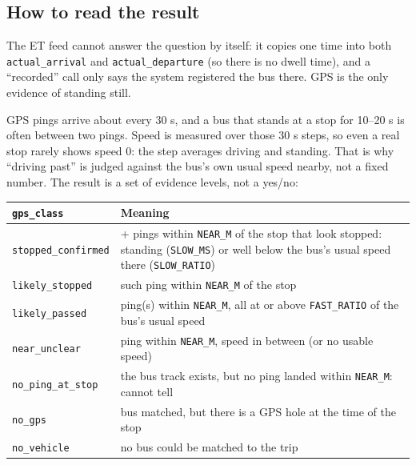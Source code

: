 \documentclass[11pt]{article}
\begin{document}
    \subsection{How to read the result}\label{how-to-read-the-result}

The ET feed cannot answer the question by itself: it copies one time
into both \texttt{actual\_arrival} and \texttt{actual\_departure} (so
there is no dwell time), and a ``recorded'' call only says the system
registered the bus there. GPS is the only evidence of standing still.

GPS pings arrive about every 30 s, and a bus that stands at a stop for
10--20 s is often between two pings. Speed is measured over those 30 s
steps, so even a real stop rarely shows speed 0: the step averages
driving and standing. That is why ``driving past'' is judged against the
bus's own usual speed nearby, not a fixed number. The result is a set of
evidence levels, not a yes/no:

\begin{longtable}[]{@{}
  >{\raggedright\arraybackslash}p{}
  >{\raggedright\arraybackslash}p{}@{}}
\toprule\noalign{}
\begin{minipage}[b]{\linewidth}\raggedright
\texttt{gps\_class}
\end{minipage} & \begin{minipage}[b]{\linewidth}\raggedright
Meaning
\end{minipage} \\
\midrule\noalign{}
\endhead
\bottomrule\noalign{}
\endlastfoot
\texttt{stopped\_confirmed} & 2+ pings within \texttt{NEAR\_M} of the
stop that look stopped: standing (\texttt{SLOW\_MS}) or well below the
bus's usual speed there (\texttt{SLOW\_RATIO}) \\
\texttt{likely\_stopped} & 1 such ping within \texttt{NEAR\_M} of the
stop \\
\texttt{likely\_passed} & ping(s) within \texttt{NEAR\_M}, all at or
above \texttt{FAST\_RATIO} of the bus's usual speed \\
\texttt{near\_unclear} & ping within \texttt{NEAR\_M}, speed in between
(or no usable speed) \\
\texttt{no\_ping\_at\_stop} & the bus track exists, but no ping landed
within \texttt{NEAR\_M}: cannot tell \\
\texttt{no\_gps} & bus matched, but there is a GPS hole at the time of
the stop \\
\texttt{no\_vehicle} & no bus could be matched to the trip \\
\end{longtable}
\end{document}
